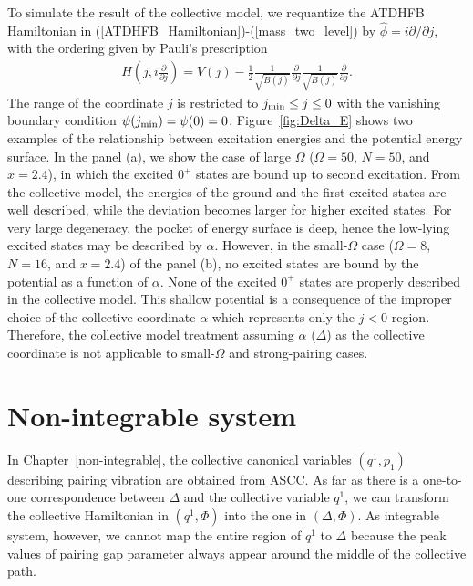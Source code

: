 \documentclass[11pt]{book} %
\begin{document}
To simulate the result of the collective model, we requantize the ATDHFB Hamiltonian in (\ref{ATDHFB_Hamiltonian})-(\ref{mass_two_level}) by $\hat{\phi}=i\partial/\partial j$, with
the ordering given by Pauli's prescription
\begin{align}
	H \left( j,i\frac{\partial}{\partial j} \right) 
= V(j) - \frac{1}{2}\frac{1}{\sqrt{B(j)}}\frac{\partial}{\partial j}\frac{1}{\sqrt{B(j)}}\frac{\partial}{\partial j}.
\end{align}
The range of the coordinate $j$ is restricted to $j_{\rm min}\leq j \leq 0$
with the vanishing boundary condition $\psi(j_{\rm min})=\psi(0)=0$.
Figure~\ref{fig:Delta_E} shows two examples of the relationship 
between excitation energies and the potential energy surface.
In the panel (a), we show the case of large $\Omega$
($\Omega=50$, $N=50$, and $x=2.4$),
in which
the excited $0^+$ states are bound up to second excitation.
From the collective model, the energies of the ground and the first excited states
are well described, while the deviation becomes larger for
higher excited states.
For very large degeneracy, the pocket of energy surface is deep, 
hence the low-lying excited states may be described by $\alpha$. 
However, in the small-$\Omega$ case ($\Omega=8$, $N=16$, and $x=2.4$)
of the panel (b), no excited states are bound by the potential
as a function of $\alpha$.
None of the excited $0^+$ states
are properly described in the collective model.
This shallow potential is a consequence of the improper
choice of the collective coordinate $\alpha$
which represents only the $j<0$ region.
Therefore, the collective model treatment assuming
$\alpha$ ($\Delta$) as the collective coordinate
is not applicable to small-$\Omega$ and strong-pairing cases.


\section{Non-integrable system}
In Chapter~\ref{non-integrable}, the collective canonical variables $(q^1, p_1)$ describing pairing vibration are obtained from ASCC.
As far as there is a one-to-one correspondence between $\Delta$ 
and the collective variable $q^1$,
we can transform the collective Hamiltonian in $(q^1,\Phi)$
into the one in $(\Delta,\Phi)$. As integrable system, however, we cannot map the entire region of $q^1$ to $\Delta$ because the peak values of pairing gap parameter always appear around the middle of the collective path.

\end{document}
